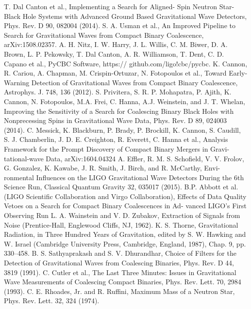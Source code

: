 \documentclass[binding=0.6cm, LaM]{sapthesis}
\begin{document}
\begin{thebibliography}{500}
          T. Dal Canton et al., Implementing a Search for Aligned- Spin Neutron Star-Black Hole Systems with Advanced Ground Based Gravitational Wave Detectors, Phys. Rev. D 90, 082004 (2014).
 	 S. A. Usman et al., An Improved Pipeline to Search for Gravitational Waves from Compact Binary Coalescence, arXiv:1508.02357.
         A. H. Nitz, I. W. Harry, J. L. Willis, C. M. Biwer, D. A. Brown, L. P. Pekowsky, T. Dal Canton, A. R. Williamson, T. Dent, C. D. Capano et al., PyCBC Software, https:// github.com/ligo!cbc/pycbc.
         K. Cannon, R. Cariou, A. Chapman, M. Crispin-Ortuzar, N. Fotopoulos et al., Toward Early-Warning Detection of Gravitational Waves from Compact Binary Coalescence, Astrophys. J. 748, 136 (2012).
 	 S. Privitera, S. R. P. Mohapatra, P. Ajith, K. Cannon, N. Fotopoulos, M.A. Frei, C. Hanna, A.J. Weinstein, and J. T. Whelan, Improving the Sensitivity of a Search for Coalescing Binary Black Holes with Nonprecessing Spins in Gravitational Wave Data, Phys. Rev. D 89, 024003 (2014).
          C. Messick, K. Blackburn, P. Brady, P. Brockill, K. Cannon, S. Caudill, S. J. Chamberlin, J. D. E. Creighton, R. Everett, C. Hanna et al., Analysis Framework for the Prompt Discovery of Compact Binary Mergers in Gravi- tational-wave Data, arXiv:1604.04324
          A. Effler, R. M. S. Schofield, V. V. Frolov, G. Gonzalez, K. Kawabe, J. R. Smith, J. Birch, and R. McCarthy, Envi- ronmental Influences on the LIGO Gravitational Wave Detectors During the 6th Science Run, Classical Quantum Gravity 32, 035017 (2015). 
         B.P. Abbott et al. (LIGO Scientific Collaboration and Virgo Collaboration), Effects of Data Quality Vetoes on a Search for Compact Binary Coalescences in Ad- vanced LIGO’s First Observing Run 
         L. A. Wainstein and V. D. Zubakov, Extraction of Signals from Noise (Prentice-Hall, Englewood Cliffs, NJ, 1962). 
          K. S. Thorne, Gravitational Radiation, in Three Hundred Years of Gravitation, edited by S. W. Hawking and W. Israel (Cambridge University Press, Cambridge, England, 1987), Chap. 9, pp. 330–458. 
         B. S. Sathyaprakash and S. V. Dhurandhar, Choice of Filters for the Detection of Gravitational Waves from Coalescing Binaries, Phys. Rev. D 44, 3819 (1991). 
 	 C. Cutler et al., The Last Three Minutes: Issues in Gravitational Wave Measurements of Coalescing Compact Binaries, Phys. Rev. Lett. 70, 2984 (1993).
 	 C. E. Rhoades, Jr. and R. Ruffini, Maximum Mass of a Neutron Star, Phys. Rev. Lett. 32, 324 (1974). 

\end{thebibliography}
\end{document}
